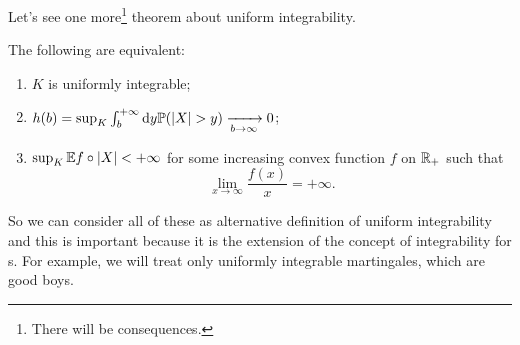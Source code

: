 \documentclass{report}
\begin{document}
Let's see one more\footnote{There will be consequences.} theorem about uniform integrability.
\begin{theorem}
	The following are equivalent:
	\begin{enumerate}[\circnum]
		\item $K$ is uniformly integrable;
		\item $h(b)=\sup_{K}\int_{b}^{+\infty}\dy \pr(|X|>y)\xrightarrow[b\to\infty]{}0$;
		\item $\sup_{K}\mathbb{E} f\circ |X|<+\infty$ for some increasing convex function $f$ on $\mathbb{R}_+$ such that
		\[\lim_{x\to\infty}\frac{f(x)}{x}=+\infty.\]
	\end{enumerate}
\end{theorem}
So we can consider all of these as alternative definition of uniform integrability and this is important because it is the extension of the concept of integrability for \rv s. For example, we will treat only uniformly integrable martingales, which are good boys.
\end{document}
